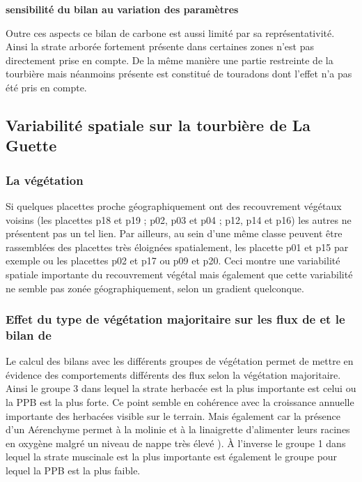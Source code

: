 \textbf{sensibilité du bilan au variation des paramètres}

Outre ces aspects ce bilan de carbone est aussi limité par sa représentativité. 
Ainsi la strate arborée fortement présente dans certaines zones n'est pas directement prise en compte.
De la même manière une partie restreinte de la tourbière mais néanmoins présente est constitué de touradons dont l'effet n'a pas été pris en compte. %

%

\subsection{Variabilité spatiale sur la tourbière de La Guette}

\subsubsection{La végétation}

Si quelques placettes proche géographiquement ont des recouvrement végétaux voisins (les placettes p18 et p19 ; p02, p03 et p04 ; p12, p14 et p16) les autres ne présentent pas un tel lien.
Par ailleurs, au sein d'une même classe peuvent être rassemblées des placettes très éloignées spatialement, les placette p01 et p15 par exemple ou les placettes p02 et p17 ou p09 et p20.
Ceci montre une variabilité spatiale importante du recouvrement végétal mais également que cette variabilité ne semble pas zonée géographiquement, selon un gradient quelconque.

\subsubsection{Effet du type de végétation majoritaire sur les flux de \coo et le bilan de \coo }
Le calcul des bilans avec les différents groupes de végétation permet de mettre en évidence des comportements différents des flux selon la végétation majoritaire.
Ainsi le groupe 3 dans lequel la strate herbacée est la plus importante est celui ou la PPB est la plus forte.
Ce point semble en cohérence avec la croissance annuelle importante des herbacées visible sur le terrain.
Mais également car la présence d'un Aérenchyme permet à la molinie et à la linaigrette d'alimenter leurs racines en oxygène malgré un niveau de nappe très élevé \citep{taylor2001,rydin2003c}).
À l'inverse le groupe 1 dans lequel la strate muscinale est la plus importante est également le groupe pour lequel la PPB est la plus faible.
\plop

